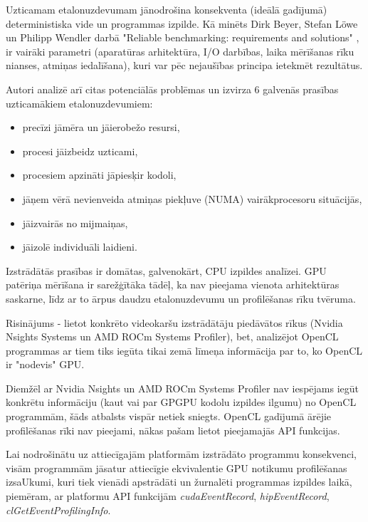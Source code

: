 Uzticamam etalonuzdevumam jānodrošina konsekventa (ideālā gadījumā) 
deterministiska vide un programmas izpilde. Kā minēts Dirk Beyer, Stefan Löwe
un Philipp Wendler darbā "Reliable benchmarking: requirements and solutions"
\cite{reliable-benchmarking}, ir vairāki parametri (aparatūras arhitektūra, I/O
darbības, laika mērīšanas rīku nianses, atmiņas iedalīšana), kuri var pēc
nejaušības principa ietekmēt rezultātus.

Autori analizē arī citas potenciālās problēmas un izvirza 6 galvenās prasības
uzticamākiem etalonuzdevumiem: \cite{reliable-benchmarking}
\begin{itemize}
    \item precīzi jāmēra un jāierobežo resursi,
    \item procesi jāizbeidz uzticami,
    \item procesiem apzināti jāpiesķir kodoli,
    \item jāņem vērā nevienveida atmiņas piekļuve (NUMA) vairākprocesoru
        situācijās,
    \item jāizvairās no mijmaiņas,
    \item jāizolē individuāli laidieni.
\end{itemize}

Izstrādātās prasības ir domātas, galvenokārt, CPU izpildes analīzei. GPU
patēriņa mērīšana ir sarežģītāka tādēļ, ka nav pieejama vienota
arhitektūras saskarne, līdz ar to ārpus daudzu etalonuzdevumu un profilēšanas
rīku tvēruma. \cite{reliable-benchmarking}

Risinājums - lietot konkrēto videokaršu izstrādātāju piedāvātos rīkus 
(Nvidia Nsights Systems\cite{nvidia-nsights} un AMD ROCm Systems
Profiler\cite{rocm-profiler}), bet, analizējot OpenCL programmas ar tiem
tiks iegūta tikai zemā līmeņa informācija par to, ko OpenCL ir "nodevis" GPU.

Diemžēl ar Nvidia Nsights un AMD ROCm Systems Profiler nav iespējams iegūt
konkrētu informāciju (kaut vai par GPGPU kodolu izpildes ilgumu) no OpenCL
programmām, šāds atbalsts vispār netiek
sniegts.\cite{rocm_sys_profiler_use_case} OpenCL gadījumā ārējie profilēšanas
rīki nav pieejami, nākas pašam lietot pieejamajās API funkcijas.

Lai nodrošinātu uz attiecīgajām platformām izstrādāto
programmu konsekvenci, visām programmām jāsatur attiecīgie ekvivalentie GPU
notikumu profilēšanas izsaUkumi, kuri tiek vienādi apstrādāti un žurnalēti
programmas izpildes laikā, piemēram, ar platformu API funkcijām
\textit{cudaEventRecord}, \textit{hipEventRecord},
\textit{clGetEventProfilingInfo}.


